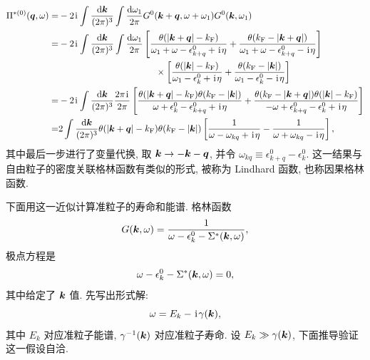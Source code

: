   \begin{align}
        \Pi^{*(0)}(\boldsymbol{q},\omega)=&-2\hspace{0.1em}\mathrm{i}\hspace{0.1em}\int\frac{\mathrm{d}\boldsymbol{k}}{(2\pi)^3}\int\frac{\mathrm{d}\omega_1}{2\pi}G^0(\boldsymbol{k}+\boldsymbol{q},\omega+\omega_1)G^0(\boldsymbol{k},\omega_1)\nonumber\\
        =&-2\hspace{0.1em}\mathrm{i}\hspace{0.1em}\int\frac{\mathrm{d}\boldsymbol{k}}{(2\pi)^3}\int\frac{\mathrm{d}\omega_1}{2\pi}\left[ \frac{\theta(|\boldsymbol{k}+\boldsymbol{q}|-k_{\mathrm{F}})}{\omega_1+\omega-\epsilon_{k+q}^0+\hspace{0.1em}\mathrm{i}\hspace{0.1em}\eta}+\frac{\theta(k_{\mathrm{F}}-|\boldsymbol{k}+\boldsymbol{q}|)}{\omega_1+\omega-\epsilon_{k+q}^0-\hspace{0.1em}\mathrm{i}\hspace{0.1em}\eta} \right]\nonumber\\
        &~~~~~~~~~~~~~~~~~~~~~~~~~~~~~~~~\times\left[ \frac{\theta(|\boldsymbol{k}|-k_{\mathrm{F}})}{\omega_1-\epsilon_k^0+\hspace{0.1em}\mathrm{i}\hspace{0.1em}\eta}+\frac{\theta(k_{\mathrm{F}}-|\boldsymbol{k}|)}{\omega_1-\epsilon_k^0-\hspace{0.1em}\mathrm{i}\hspace{0.1em}\eta} \right]\nonumber\\
        =&-2\hspace{0.1em}\mathrm{i}\hspace{0.1em}\int\frac{\mathrm{d}\boldsymbol{k}}{(2\pi)^3}\frac{2\pi\hspace{0.1em}\mathrm{i}\hspace{0.1em}}{2\pi}\left[ \frac{\theta(|\boldsymbol{k}+\boldsymbol{q}|-k_{\mathrm{F}})\theta(k_{\mathrm{F}}-|\boldsymbol{k}|)}{\omega+\epsilon_k^0-\epsilon_{k+q}^0+\hspace{0.1em}\mathrm{i}\hspace{0.1em}\eta}+\frac{\theta(k_{\mathrm{F}}-|\boldsymbol{k}+\boldsymbol{q}|)\theta(|\boldsymbol{k}|-k_{\mathrm{F}})}{-\omega+\epsilon_{k+q}^0-\epsilon_k^0+\hspace{0.1em}\mathrm{i}\hspace{0.1em}\eta} \right]\nonumber\\
        =&2\int\frac{\mathrm{d}\boldsymbol{k}}{(2\pi)^3}\theta(|\boldsymbol{k}+\boldsymbol{q}|-k_{\mathrm{F}})\theta(k_{\mathrm{F}}-|\boldsymbol{k}|)\left[ \frac{1}{\omega-\omega_{kq}+\hspace{0.1em}\mathrm{i}\hspace{0.1em}\eta}-\frac{1}{\omega+\omega_{kq}-\hspace{0.1em}\mathrm{i}\hspace{0.1em}\eta} \right],
    \end{align}
其中最后一步进行了变量代换, 取 $\boldsymbol{k}\to -\boldsymbol{k}-\boldsymbol{q}$, 并令 $\omega_{kq}\equiv \epsilon_{k+q}^0-\epsilon_k^0$. 这一结果与自由粒子的密度关联格林函数有类似的形式, 被称为 Lindhard 函数, 也称因果格林函数.

下面用这一近似计算准粒子的寿命和能谱. 格林函数 
\begin{equation}
    G(\boldsymbol{k},\omega)=\frac{1}{\omega-\epsilon_k^0-\Sigma^*(\boldsymbol{k},\omega)},
\end{equation}
极点方程是
\begin{equation}
    \omega-\epsilon_k^0-\Sigma^*(\boldsymbol{k},\omega)=0,
\end{equation}
其中给定了 $\boldsymbol{k}$ 值. 先写出形式解:
\begin{equation}
    \omega=E_k-\hspace{0.1em}\mathrm{i}\hspace{0.1em}\gamma(\boldsymbol{k}),
\end{equation} 
其中 $E_k$ 对应准粒子能谱, $\gamma^{-1}(\boldsymbol{k})$ 对应准粒子寿命. 设 $E_k\gg \gamma(\boldsymbol{k})$, 下面推导验证这一假设自洽. 

